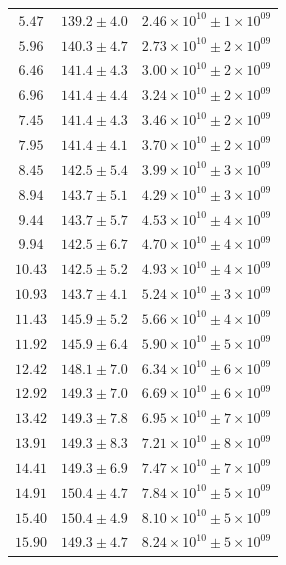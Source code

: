 \documentclass{article}
\begin{document}
\begin{table}[h!]
\begin{tabular}{|c|c|c|}
        $5.47$ & $139.2 \pm 4.0$ & $2.46\times 10^{10} \pm 1\times 10^{09}$ \\
        $5.96$ & $140.3 \pm 4.7$ & $2.73\times 10^{10} \pm 2\times 10^{09}$ \\
        $6.46$ & $141.4 \pm 4.3$ & $3.00\times 10^{10} \pm 2\times 10^{09}$ \\
        $6.96$ & $141.4 \pm 4.4$ & $3.24\times 10^{10} \pm 2\times 10^{09}$ \\
        $7.45$ & $141.4 \pm 4.3$ & $3.46\times 10^{10} \pm 2\times 10^{09}$ \\
        $7.95$ & $141.4 \pm 4.1$ & $3.70\times 10^{10} \pm 2\times 10^{09}$ \\
        $8.45$ & $142.5 \pm 5.4$ & $3.99\times 10^{10} \pm 3\times 10^{09}$ \\
        $8.94$ & $143.7 \pm 5.1$ & $4.29\times 10^{10} \pm 3\times 10^{09}$ \\
        $9.44$ & $143.7 \pm 5.7$ & $4.53\times 10^{10} \pm 4\times 10^{09}$ \\
        $9.94$ & $142.5 \pm 6.7$ & $4.70\times 10^{10} \pm 4\times 10^{09}$ \\
        $10.43$ & $142.5 \pm 5.2$ & $4.93\times 10^{10} \pm 4\times 10^{09}$ \\
        $10.93$ & $143.7 \pm 4.1$ & $5.24\times 10^{10} \pm 3\times 10^{09}$ \\
        $11.43$ & $145.9 \pm 5.2$ & $5.66\times 10^{10} \pm 4\times 10^{09}$ \\
        $11.92$ & $145.9 \pm 6.4$ & $5.90\times 10^{10} \pm 5\times 10^{09}$ \\
        $12.42$ & $148.1 \pm 7.0$ & $6.34\times 10^{10} \pm 6\times 10^{09}$ \\
        $12.92$ & $149.3 \pm 7.0$ & $6.69\times 10^{10} \pm 6\times 10^{09}$ \\
        $13.42$ & $149.3 \pm 7.8$ & $6.95\times 10^{10} \pm 7\times 10^{09}$ \\
        $13.91$ & $149.3 \pm 8.3$ & $7.21\times 10^{10} \pm 8\times 10^{09}$ \\
        $14.41$ & $149.3 \pm 6.9$ & $7.47\times 10^{10} \pm 7\times 10^{09}$ \\
        $14.91$ & $150.4 \pm 4.7$ & $7.84\times 10^{10} \pm 5\times 10^{09}$ \\
        $15.40$ & $150.4 \pm 4.9$ & $8.10\times 10^{10} \pm 5\times 10^{09}$ \\
        $15.90$ & $149.3 \pm 4.7$ & $8.24\times 10^{10} \pm 5\times 10^{09}$ \\

\end{tabular}
\end{table}
\end{document}
